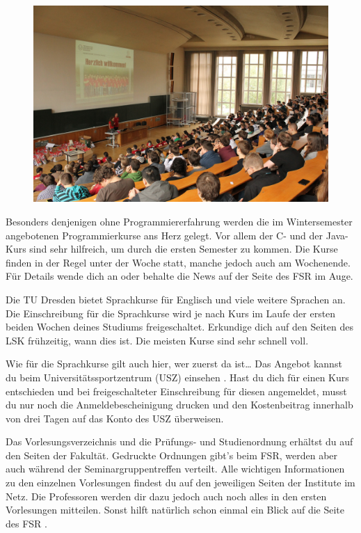 \begin{itemize}[leftmargin=*]
\begin{figure}[b!]
\centering
\includegraphics[width=.99\linewidth]{img/ese2013/barschoe.jpg}
\end{figure}

Besonders denjenigen ohne Programmiererfahrung werden die im Wintersemester
angebotenen Programmierkurse ans Herz gelegt. Vor allem der C- und der Java-Kurs
sind sehr hilfreich, um durch die ersten Semester zu kommen. Die Kurse finden in
der Regel unter der Woche statt, manche jedoch auch am Wochenende. Für Details
wende dich an  oder behalte die News auf der
Seite des FSR  im Auge.

Die TU Dresden bietet Sprachkurse für Englisch und viele weitere Sprachen an.
Die Einschreibung für die Sprachkurse wird je nach Kurs im Laufe der ersten
beiden Wochen deines Studiums freigeschaltet. Erkundige dich auf den Seiten des
LSK  frühzeitig, wann dies ist. Die
meisten Kurse sind sehr schnell voll.

Wie für die Sprachkurse gilt auch hier, wer zuerst da ist\ldots{} Das Angebot
kannst du beim Universitätssportzentrum (USZ) einsehen
. Hast du dich für einen Kurs entschieden und
bei freigeschalteter Einschreibung für diesen angemeldet, musst du nur noch die
Anmeldebescheinigung drucken und den Kostenbeitrag innerhalb von drei Tagen auf
das Konto des USZ überweisen.

Das Vorlesungsverzeichnis
 und die Prüfungs- und
Studienordnung
 erhältst du
auf den Seiten der Fakultät. Gedruckte Ordnungen gibt's beim FSR, werden aber auch während der Seminargruppentreffen verteilt.
Alle wichtigen Informationen zu den einzelnen Vorlesungen findest du
auf den jeweiligen Seiten der Institute im Netz.  Die Professoren werden dir
dazu jedoch auch noch alles in den ersten Vorlesungen mitteilen. Sonst hilft
natürlich schon einmal ein Blick auf die Seite des FSR
.


\end{itemize}
